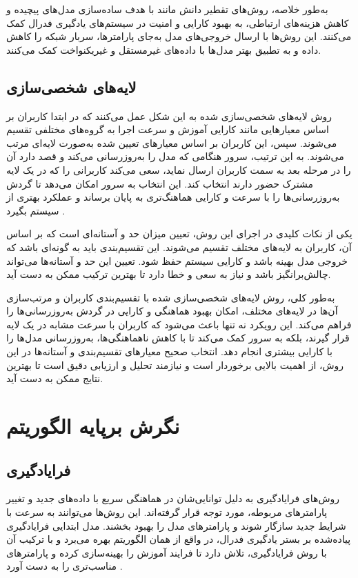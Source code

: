 به‌طور خلاصه، روش‌های تقطیر دانش مانند
با هدف ساده‌سازی مدل‌های پیچیده و کاهش هزینه‌های ارتباطی، به بهبود کارایی و امنیت در سیستم‌های یادگیری فدرال کمک می‌کنند. این روش‌ها با ارسال خروجی‌های مدل به‌جای پارامترها، سربار شبکه را کاهش داده و به تطبیق بهتر مدل‌ها با داده‌های غیرمستقل و غیریکنواخت کمک می‌کنند.


\subsection{
	لایه‌های شخصی‌سازی%
}
روش لایه‌های شخصی‌سازی شده به این شکل عمل می‌کنند که در ابتدا کاربران بر اساس معیارهایی مانند کارایی آموزش و سرعت اجرا به گروه‌های مختلفی تقسیم می‌شوند. سپس، این کاربران بر اساس معیارهای تعیین شده به‌صورت لایه‌ای مرتب می‌شوند. به این ترتیب، سرور هنگامی که مدل را به‌روزرسانی می‌کند و قصد دارد آن را در مرحله بعد به سمت کاربران ارسال نماید، سعی می‌کند کاربرانی را که در یک لایه مشترک حضور دارند انتخاب کند. این انتخاب به سرور امکان می‌دهد تا گردش به‌روزرسانی‌ها را با سرعت و کارایی هماهنگ‌تری به پایان برساند و عملکرد بهتری از سیستم بگیرد
\cite{chai2020tifl}.

یکی از نکات کلیدی در اجرای این روش، تعیین میزان حد و آستانه‌ای است که بر اساس آن، کاربران به لایه‌های مختلف تقسیم می‌شوند. این تقسیم‌بندی باید به گونه‌ای باشد که خروجی مدل بهینه باشد و کارایی سیستم حفظ شود. تعیین این حد و آستانه‌ها می‌تواند چالش‌برانگیز باشد و نیاز به سعی و خطا دارد تا بهترین ترکیب ممکن به دست آید.

به‌طور کلی، روش لایه‌های شخصی‌سازی شده با تقسیم‌بندی کاربران و مرتب‌سازی آن‌ها در لایه‌های مختلف، امکان بهبود هماهنگی و کارایی در گردش به‌روزرسانی‌ها را فراهم می‌کند. این رویکرد نه تنها باعث می‌شود که کاربران با سرعت مشابه در یک لایه قرار گیرند، بلکه به سرور کمک می‌کند تا با کاهش ناهماهنگی‌ها، به‌روزرسانی مدل‌ها را با کارایی بیشتری انجام دهد. انتخاب صحیح معیارهای تقسیم‌بندی و آستانه‌ها در این روش، از اهمیت بالایی برخوردار است و نیازمند تحلیل و ارزیابی دقیق است تا بهترین نتایج ممکن به دست آید.




\section{نگرش برپایه الگوریتم}
\subsection{فرایادگیری}
روش‌های فرایادگیری به دلیل توانایی‌شان در هماهنگی سریع با داده‌های جدید و تغییر پارامترهای مربوطه، مورد توجه قرار گرفته‌اند. این روش‌ها می‌توانند به سرعت با شرایط جدید سازگار شوند و پارامترهای مدل را بهبود بخشند.
مدل ابتدایی فرایادگیری پیاده‌شده بر بستر یادگیری فدرال، در واقع از همان الگوریتم
بهره می‌برد و با ترکیب آن با روش فرایادگیری، تلاش دارد تا فرایند آموزش را بهینه‌سازی کرده و پارامترهای مناسب‌تری را به دست آورد
\cite{jiang2019improving}.

